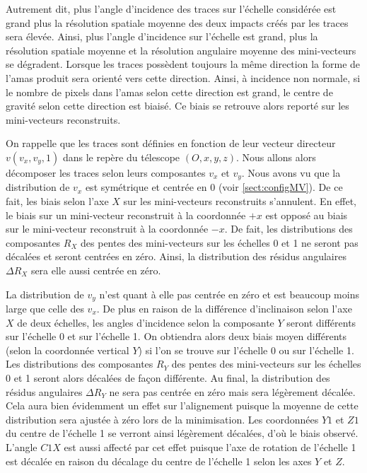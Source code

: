   \medskip
  
  Autrement dit, plus l'angle d'incidence des traces sur l'\'echelle consid\'er\'ee est grand plus la r\'esolution spatiale moyenne des deux impacts cr\'e\'es par les traces sera \'elev\'ee. Ainsi, plus l'angle d'incidence sur l'\'echelle est grand, plus la r\'esolution spatiale moyenne et la r\'esolution angulaire moyenne des mini-vecteurs se d\'egradent. Lorsque les traces poss\`edent toujours la m\^eme direction la forme de l'amas produit sera orient\'e vers cette direction. Ainsi, \`a incidence non normale, si le nombre de pixels dans l'amas selon cette direction est grand, le centre de gravit\'e selon cette direction est biais\'e. Ce biais se retrouve alors report\'e sur les mini-vecteurs reconstruits.
  
  \medskip
  
  On rappelle que les traces sont d\'efinies en fonction de leur vecteur directeur $v(v_x, v_y, 1)$ dans le repère du télescope $(O,x,y,z)$. Nous allons alors d\'ecomposer les traces selon leurs composantes $v_x$ et $v_y$. Nous avons vu que la distribution de $v_x$ est sym\'etrique et centr\'ee en 0 (voir \ref{sect:configMV}). De ce fait, les biais selon l'axe $X$ sur les mini-vecteurs reconstruits s'annulent. En effet, le biais sur un mini-vecteur reconstruit \`a la coordonn\'ee $+x$ est oppos\'e au biais sur le mini-vecteur reconstruit \`a la coordonn\'ee $-x$. De fait, les distributions des composantes $R_X$ des pentes des mini-vecteurs sur les \'echelles 0 et 1 ne seront pas d\'ecal\'ees et seront centr\'ees en z\'ero. Ainsi, la distribution des r\'esidus angulaires $\Delta R_X$ sera elle aussi centr\'ee en z\'ero.
  
  \medskip

  La distribution de $v_y$ n'est quant \`a elle pas centr\'ee en z\'ero et est beaucoup moins large que celle des $v_x$. De plus en raison de la diff\'erence d'inclinaison selon l'axe $X$ de deux \'echelles, les angles d'incidence selon la composante $Y$ seront diff\'erents sur l'\'echelle 0 et sur l'\'echelle 1. On obtiendra alors deux biais moyen diff\'erents (selon la coordonn\'ee vertical $Y$) si l'on se trouve sur l'\'echelle 0 ou sur l'\'echelle 1. Les distributions des composantes $R_Y$ des pentes des mini-vecteurs sur les \'echelles 0 et 1 seront alors d\'ecal\'ees de façon diff\'erente. Au final, la distribution des r\'esidus angulaires $\Delta R_Y$ ne sera pas centr\'ee en z\'ero mais sera l\'eg\`erement d\'ecal\'ee. Cela aura bien \'evidemment un effet sur l'alignement puisque la moyenne de cette distribution sera ajust\'ee \`a z\'ero lors de la minimisation. Les coordonn\'ees $Y1$ et $Z1$ du centre de l'\'echelle 1 se verront ainsi l\'eg\`erement d\'ecal\'ees, d'o\`u le biais observ\'e. L'angle $C1X$ est aussi affect\'e par cet effet puisque l'axe de rotation de l'\'echelle 1 est d\'ecal\'ee en raison du d\'ecalage du centre de l'\'echelle 1 selon les axes $Y$ et $Z$.
  
